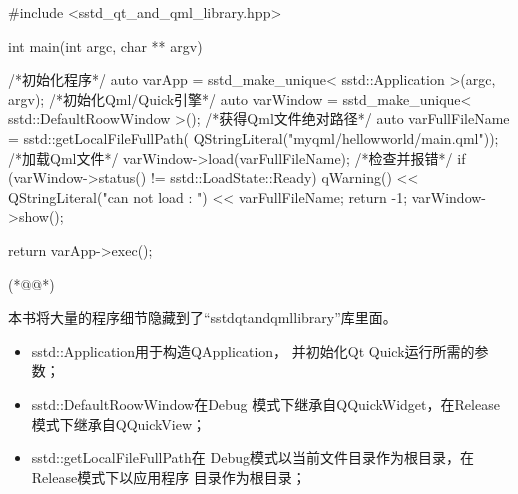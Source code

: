 \label{f000030}    %
\FloatBarrier                                  %
\begin{thebookfilesourceone}[escapeinside={(*@}{@*)},
caption=GoodLuck,
title=\filesourcenumbernameone \thefilesourcenumber
]
#include <sstd_qt_and_qml_library.hpp>

int main(int argc, char ** argv) {

    /*初始化程序*/
    auto varApp = sstd_make_unique< sstd::Application >(argc, argv);
    /*初始化Qml/Quick引擎*/
    auto varWindow = sstd_make_unique< sstd::DefaultRoowWindow >();
    {
        /*获得Qml文件绝对路径*/
        auto varFullFileName = sstd::getLocalFileFullPath(
            QStringLiteral("myqml/hellowworld/main.qml"));
        /*加载Qml文件*/
        varWindow->load(varFullFileName);
        /*检查并报错*/
        if (varWindow->status() != sstd::LoadState::Ready) {
            qWarning() <<
                       QStringLiteral("can not load : ")
                       << varFullFileName;
            return -1;
        }
    }
    varWindow->show();

    return varApp->exec();

}(*@\marginpar[\hfill\setlength\fboxsep{2pt}\fbox{\footnotesize{\kaishu\parbox{1em}{\setlength{\baselineskip}{2pt}\filesourcenumbernameone}}\footnotesize{\thefilesourcenumber}}]{\setlength\fboxsep{2pt}\fbox{\footnotesize{\kaishu\parbox{1em}{\setlength{\baselineskip}{2pt}\filesourcenumbernameone}}\footnotesize{\thefilesourcenumber}}}@*)\end{thebookfilesourceone}          %
\addtocounter{lstlisting}{-1}   %

本书将大量的程序细节隐藏到了“sstd\underline{\hspace{0.5em}}qt\underline{\hspace{0.5em}}and\underline{\hspace{0.5em}}qml\underline{\hspace{0.5em}}library”库里面。

\begin{itemize}
\item sstd::Application用于构造QApplication，
并初始化Qt Quick运行所需的参数；
\item sstd::DefaultRoowWindow在Debug
模式下继承自QQuickWidget，在Release模式下继承自QQuickView；
\item sstd::getLocalFileFullPath在
Debug模式以当前文件目录作为根目录，在Release模式下以应用程序
目录作为根目录；
\end{itemize}

